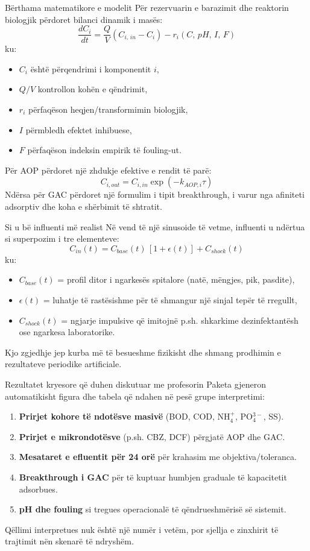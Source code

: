 \documentclass[aspectratio=169]{beamer}
\begin{document}
\begin{frame}{Bërthama matematikore e modelit}
\justifying
Për rezervuarin e barazimit dhe reaktorin biologjik përdoret bilanci dinamik i masës:
\[
\frac{dC_i}{dt}=\frac{Q}{V}\left(C_{i,\,in}-C_i\right)-r_i(C,\,pH,\,I,\,F)
\]
ku:
\begin{itemize}
    \item $C_i$ është përqendrimi i komponentit $i$,
    \item $Q/V$ kontrollon kohën e qëndrimit,
    \item $r_i$ përfaqëson heqjen/transformimin biologjik,
    \item $I$ përmbledh efektet inhibuese,
    \item $F$ përfaqëson indeksin empirik të fouling-ut.
\end{itemize}
Për AOP përdoret një zhdukje efektive e rendit të parë:
\[
C_{i,out}=C_{i,in}\exp(-k_{AOP,i}\tau)
\]
Ndërsa për GAC përdoret një formulim i tipit breakthrough, i varur nga afiniteti adsorptiv dhe koha e shërbimit të shtratit.
\end{frame}

\begin{frame}{Si u bë influenti më realist}
\justifying
Në vend të një sinusoide të vetme, influenti u ndërtua si superpozim i tre elementeve:
\[
C_{in}(t)=C_{base}(t)\,[1+\epsilon(t)] + C_{shock}(t)
\]
ku:
\begin{itemize}
    \item $C_{base}(t)$ = profil ditor i ngarkesës spitalore (natë, mëngjes, pik, pasdite),
    \item $\epsilon(t)$ = luhatje të rastësishme për të shmangur një sinjal tepër të rregullt,
    \item $C_{shock}(t)$ = ngjarje impulsive që imitojnë p.sh. shkarkime dezinfektantësh ose ngarkesa laboratorike.
\end{itemize}
\vspace{0.5em}
Kjo zgjedhje jep kurba më të besueshme fizikisht dhe shmang prodhimin e rezultateve periodike artificiale.
\end{frame}

\begin{frame}{Rezultatet kryesore që duhen diskutuar me profesorin}
\justifying
Paketa gjeneron automatikisht figura dhe tabela që ndahen në pesë grupe interpretimi:
\begin{enumerate}
    \item \textbf{Prirjet kohore të ndotësve masivë} (BOD, COD, NH$_4^+$, PO$_4^{3-}$, SS).
    \item \textbf{Prirjet e mikrondotësve} (p.sh. CBZ, DCF) përgjatë AOP dhe GAC.
    \item \textbf{Mesataret e efluentit për 24 orë} për krahasim me objektiva/toleranca.
    \item \textbf{Breakthrough i GAC} për të kuptuar humbjen graduale të kapacitetit adsorbues.
    \item \textbf{pH dhe fouling} si tregues operacionalë të qëndrueshmërisë së sistemit.
\end{enumerate}
Qëllimi interpretues nuk është një numër i vetëm, por \alert{sjellja e zinxhirit të trajtimit} nën skenarë të ndryshëm.
\end{frame}
\end{document}
